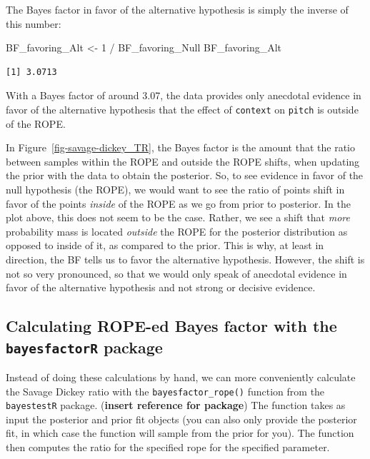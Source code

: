 \documentclass[
  doc,
  floatsintext,
  longtable,
  nolmodern,
  notxfonts,
  notimes,
  colorlinks=true,linkcolor=blue,citecolor=blue,urlcolor=blue]{apa7}
\newenvironment{Shaded}{\begin{snugshade}}{\end{snugshade}}
\newcommand{\DecValTok}[1]{\textcolor[rgb]{0.68,0.00,0.00}{#1}}
\newcommand{\NormalTok}[1]{\textcolor[rgb]{0.00,0.23,0.31}{#1}}
\newcommand{\OtherTok}[1]{\textcolor[rgb]{0.00,0.23,0.31}{#1}}
\newcommand{\SpecialCharTok}[1]{\textcolor[rgb]{0.37,0.37,0.37}{#1}}
\begin{document}
The Bayes factor in favor of the alternative hypothesis is simply the
inverse of this number:

\begin{Shaded}
\begin{Highlighting}[]
\NormalTok{BF\_favoring\_Alt }\OtherTok{\textless{}{-}} \DecValTok{1} \SpecialCharTok{/}\NormalTok{ BF\_favoring\_Null}
\NormalTok{BF\_favoring\_Alt}
\end{Highlighting}
\end{Shaded}

\begin{verbatim}
[1] 3.0713
\end{verbatim}

With a Bayes factor of around 3.07, the data provides only anecdotal
evidence in favor of the alternative hypothesis that the effect of
\texttt{context} on \texttt{pitch} is outside of the ROPE.

In Figure~\ref{fig-savage-dickey_TR}, the Bayes factor is the amount
that the ratio between samples within the ROPE and outside the ROPE
shifts, when updating the prior with the data to obtain the posterior.
So, to see evidence in favor of the null hypothesis (the ROPE), we would
want to see the ratio of points shift in favor of the points
\emph{inside} of the ROPE as we go from prior to posterior. In the plot
above, this does not seem to be the case. Rather, we see a shift that
\emph{more} probability mass is located \emph{outside} the ROPE for the
posterior distribution as opposed to inside of it, as compared to the
prior. This is why, at least in direction, the BF tells us to favor the
alternative hypothesis. However, the shift is not so very pronounced, so
that we would only speak of anecdotal evidence in favor of the
alternative hypothesis and not strong or decisive evidence.

\subsection{\texorpdfstring{Calculating ROPE-ed Bayes factor with the
\texttt{bayesfactorR}
package}{Calculating ROPE-ed Bayes factor with the bayesfactorR package}}\label{calculating-rope-ed-bayes-factor-with-the-bayesfactorr-package}

Instead of doing these calculations by hand, we can more conveniently
calculate the Savage Dickey ratio with the \texttt{bayesfactor\_rope()}
function from the \texttt{bayestestR} package. (\textbf{insert reference
for package}) The function takes as input the posterior and prior fit
objects (you can also only provide the posterior fit, in which case the
function will sample from the prior for you). The function then computes
the ratio for the specified rope for the specified parameter.
\end{document}
